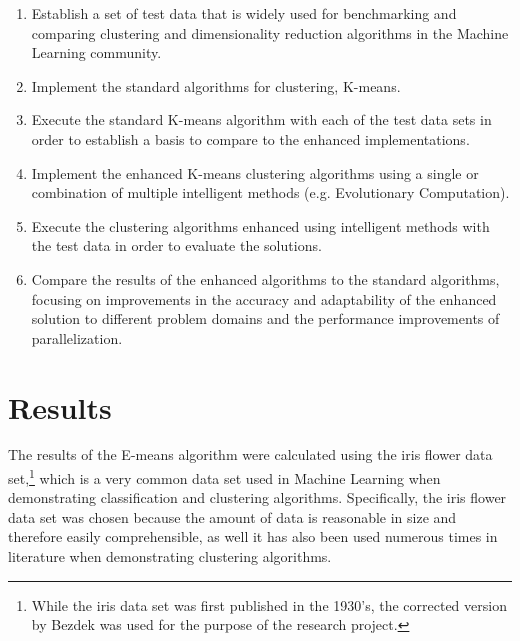\documentclass{article}
\begin{document}
\begin{enumerate}

\item Establish a set of test data that is widely used for benchmarking and comparing clustering and dimensionality reduction algorithms in the Machine Learning community.

\item Implement the standard algorithms for clustering, K-means.

\item Execute the standard K-means algorithm with each of the test data sets in order to establish a basis to compare to the enhanced implementations.

\item Implement the enhanced K-means clustering algorithms using a single or combination of multiple intelligent methods (e.g. Evolutionary Computation).

\item Execute the clustering algorithms enhanced using intelligent methods with the test data in order to evaluate the solutions.

\item Compare the results of the enhanced algorithms to the standard algorithms, focusing on improvements in the accuracy and adaptability of the enhanced solution to different problem domains and the performance improvements of parallelization.

\end{enumerate}






\section{Results}

The results of the E-means algorithm were calculated using the iris flower data set,\footnote{While the iris data set was first published in the 1930's, the corrected version by Bezdek was used for the purpose of the research project.} which is a very common data set used in Machine Learning when demonstrating classification and clustering algorithms\cite{bezdek1999will}. Specifically, the iris flower data set was chosen because the amount of data is reasonable in size and therefore easily comprehensible, as well it has also been used numerous times in literature when demonstrating clustering algorithms\cite{ben2002support, jiang2001two, horn2001algorithm}.
\end{document}
